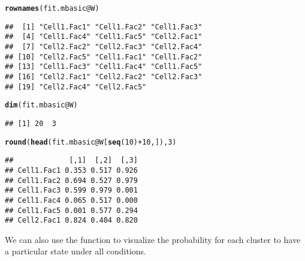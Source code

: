\documentclass[a4paper,10pt]{article}\usepackage[]{graphicx}\usepackage[]{color}
\makeatletter
\newcommand{\hlnum}[1]{\textcolor[rgb]{0.686,0.059,0.569}{#1}}%
\newcommand{\hlopt}[1]{\textcolor[rgb]{0,0,0}{#1}}%
\newcommand{\hlstd}[1]{\textcolor[rgb]{0.345,0.345,0.345}{#1}}%
\newcommand{\hlkwc}[1]{\textcolor[rgb]{0.333,0.667,0.333}{#1}}%
\newcommand{\hlkwd}[1]{\textcolor[rgb]{0.737,0.353,0.396}{\textbf{#1}}}%
\newenvironment{kframe}{%
 \def\at@end@of@kframe{}%
 \ifinner\ifhmode%
  \def\at@end@of@kframe{\end{minipage}}%
  \begin{minipage}{\columnwidth}%
 \fi\fi%
 \def\FrameCommand##1{\hskip\@totalleftmargin \hskip-\fboxsep
 \colorbox{shadecolor}{##1}\hskip-\fboxsep
     \hskip-\linewidth \hskip-\@totalleftmargin \hskip\columnwidth}%
 \MakeFramed {\advance\hsize-\width
   \@totalleftmargin\z@ \linewidth\hsize
   \@setminipage}}%
 {\par\unskip\endMakeFramed%
 \at@end@of@kframe}
\newenvironment{knitrout}{}{} %
\makeatother
\begin{document}
\begin{knitrout}
\color{fgcolor}\begin{kframe}
\begin{alltt}
\hlkwd{rownames}\hlstd{(fit.mbasic}\hlopt{@}\hlkwc{W}\hlstd{)}
\end{alltt}
\begin{verbatim}
##  [1] "Cell1.Fac1" "Cell1.Fac2" "Cell1.Fac3"
##  [4] "Cell1.Fac4" "Cell1.Fac5" "Cell2.Fac1"
##  [7] "Cell2.Fac2" "Cell2.Fac3" "Cell2.Fac4"
## [10] "Cell2.Fac5" "Cell1.Fac1" "Cell1.Fac2"
## [13] "Cell1.Fac3" "Cell1.Fac4" "Cell1.Fac5"
## [16] "Cell2.Fac1" "Cell2.Fac2" "Cell2.Fac3"
## [19] "Cell2.Fac4" "Cell2.Fac5"
\end{verbatim}
\begin{alltt}
\hlkwd{dim}\hlstd{(fit.mbasic}\hlopt{@}\hlkwc{W}\hlstd{)}
\end{alltt}
\begin{verbatim}
## [1] 20  3
\end{verbatim}
\begin{alltt}
\hlkwd{round}\hlstd{(}\hlkwd{head}\hlstd{(fit.mbasic}\hlopt{@}\hlkwc{W}\hlstd{[}\hlkwd{seq}\hlstd{(}\hlnum{10}\hlstd{)} \hlopt{+} \hlnum{10}\hlstd{, ]),} \hlnum{3}\hlstd{)}
\end{alltt}
\begin{verbatim}
##             [,1]  [,2]  [,3]
## Cell1.Fac1 0.353 0.517 0.926
## Cell1.Fac2 0.694 0.527 0.979
## Cell1.Fac3 0.599 0.979 0.001
## Cell1.Fac4 0.065 0.517 0.000
## Cell1.Fac5 0.001 0.577 0.294
## Cell2.Fac1 0.824 0.404 0.820
\end{verbatim}
\end{kframe}
\end{knitrout}

We can also use the  function to visualize the probability for each cluster to have a particular state under all conditions.
\end{document}
